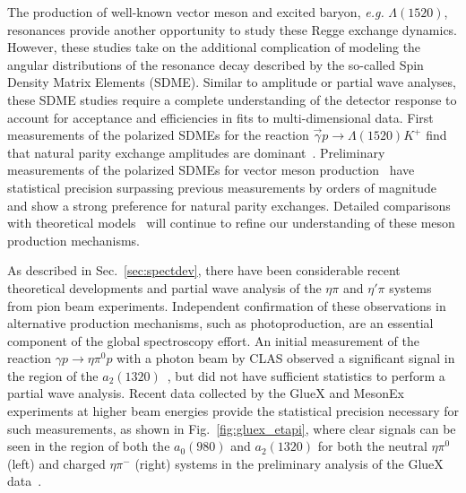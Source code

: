 The production of well-known vector meson and excited baryon, \textit{e.g.} $\Lambda(1520)$, resonances provide another opportunity to study these Regge exchange dynamics.  However, these studies take on the additional complication of modeling the angular distributions of the resonance decay described by the so-called Spin Density Matrix Elements (SDME).  Similar to amplitude or partial wave analyses, these SDME studies require a complete understanding of the detector response to account for acceptance and efficiencies in fits to multi-dimensional data.  First measurements of the polarized SDMEs for the reaction $\vec{\gamma}p \rightarrow \Lambda(1520)K^+$ find that natural parity exchange amplitudes are dominant~\cite{GlueX:2021pcl}.  Preliminary measurements of the polarized SDMEs for vector meson production~\cite{Austregesilo:2019tld} have statistical precision surpassing previous measurements by orders of magnitude~\cite{Ballam:1972eq} and show a strong preference for natural parity exchanges.  Detailed comparisons with theoretical models~\cite{Mathieu:2018xyc} will continue to refine our understanding of these meson production mechanisms.

As described in Sec.~\ref{sec:spectdev}, there have been considerable recent theoretical developments and partial wave analysis of the $\eta\pi$ and $\eta'\pi$ systems from pion beam experiments.  Independent confirmation of these observations in alternative production mechanisms, such as photoproduction, are an essential component of the global spectroscopy effort.  An initial measurement of the reaction $\gamma p \rightarrow \eta\pi^0 p$ with a photon beam by CLAS observed a significant signal in the region of the $a_2(1320)$~\cite{CLAS:2020rdz}, but did not have sufficient statistics to perform a partial wave analysis.  Recent data collected by the GlueX and MesonEx experiments at higher beam energies provide the statistical precision necessary for such measurements, as shown in Fig.~\ref{fig:gluex_etapi}, where clear signals can be seen in the region of both the $a_0(980)$ and $a_2(1320)$ for both the neutral $\eta\pi^0$ (left) and charged $\eta\pi^-$ (right) systems in the preliminary analysis of the GlueX data~\cite{gluexetapihadron}.


